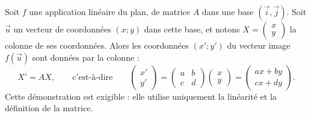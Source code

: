 \documentclass[11pt]{article}
\begin{document}
\begin{propriete}
Soit $f$ une application linéaire du plan, de matrice $A$ dans une base $(\vec{i}, \vec{j})$. Soit $\vec{u}$ un vecteur de coordonnées $(x ; y)$ dans cette base, et notons $X = \begin{pmatrix} x \\ y \end{pmatrix}$ la colonne de ses coordonnées. Alors les coordonnées $(x' ; y')$ du vecteur image $f(\vec{u})$ sont données par la colonne :
\[ X' = AX, \qquad \text{c'est-à-dire} \qquad \begin{pmatrix} x' \\ y' \end{pmatrix} = \begin{pmatrix} a & b \\ c & d \end{pmatrix} \begin{pmatrix} x \\ y \end{pmatrix} = \begin{pmatrix} ax + by \\ cx + dy \end{pmatrix}. \]
Cette démonstration est exigible : elle utilise uniquement la linéarité et la définition de la matrice.
\end{propriete}
\end{document}
